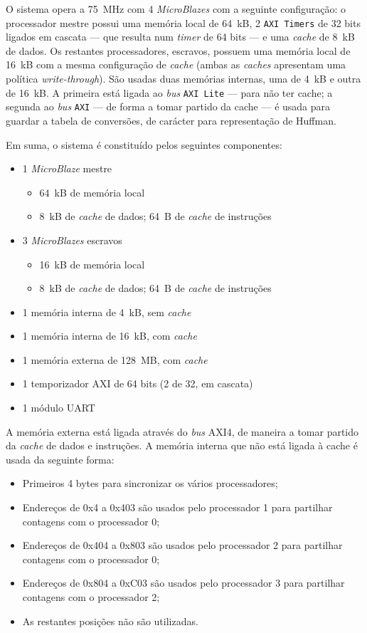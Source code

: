 O sistema opera a 75~MHz com 4 \textit{MicroBlazes} com a seguinte configuração:
o processador mestre possui uma memória local de 64~kB, 2 \texttt{AXI~Timers} de 32 bits ligados em cascata --- que resulta num \textit{timer} de 64 bits --- e uma \textit{cache} de 8~kB de dados. Os restantes processadores, escravos, possuem uma memória local de 16~kB com a mesma configuração de \textit{cache} (ambas as \textit{caches} apresentam uma política \textit{write-through}). São usadas duas memórias internas, uma de 4~kB e outra de 16~kB. A primeira está ligada ao \textit{bus} \texttt{AXI Lite} --- para não ter cache; a segunda ao \textit{bus} \texttt{AXI} --- de forma a tomar partido da cache --- é usada para guardar a tabela de conversões, de carácter para representação de Huffman.

Em suma, o sistema é constituído pelos seguintes componentes:

\begin{itemize}
	\item 1 \textit{MicroBlaze} mestre
    \begin{itemize}
		\item 64~kB de memória local
        \item 8~kB de \textit{cache} de dados; 64~B de \textit{cache} de instruções
	\end{itemize}
    \item 3 \textit{MicroBlazes} escravos
    \begin{itemize}
		\item 16~kB de memória local
        \item 8~kB de \textit{cache} de dados; 64~B de \textit{cache} de instruções
	\end{itemize}
    \item 1 memória interna de 4~kB, sem \textit{cache}
    \item 1 memória interna de 16~kB, com \textit{cache}
    \item 1 memória externa de 128~MB, com \textit{cache}
    \item 1 temporizador AXI de 64 bits (2 de 32, em cascata)
    \item 1 módulo UART
\end{itemize}


A memória externa está ligada através do \textit{bus} AXI4, de maneira a tomar partido da \textit{cache} de dados e instruções. A memória interna que não está ligada à cache é usada da seguinte forma:

\begin{itemize}
\item Primeiros 4 bytes para sincronizar os vários processadores;
\item Endereços de 0x4 a 0x403 são usados pelo processador 1 para partilhar contagens com o processador 0;
\item Endereços de 0x404 a 0x803 são usados pelo processador 2 para partilhar contagens com o processador 0;
\item Endereços de 0x804 a 0xC03 são usados pelo processador 3 para partilhar contagens com o processador 2;
\item As restantes posições não são utilizadas.
\end{itemize}



